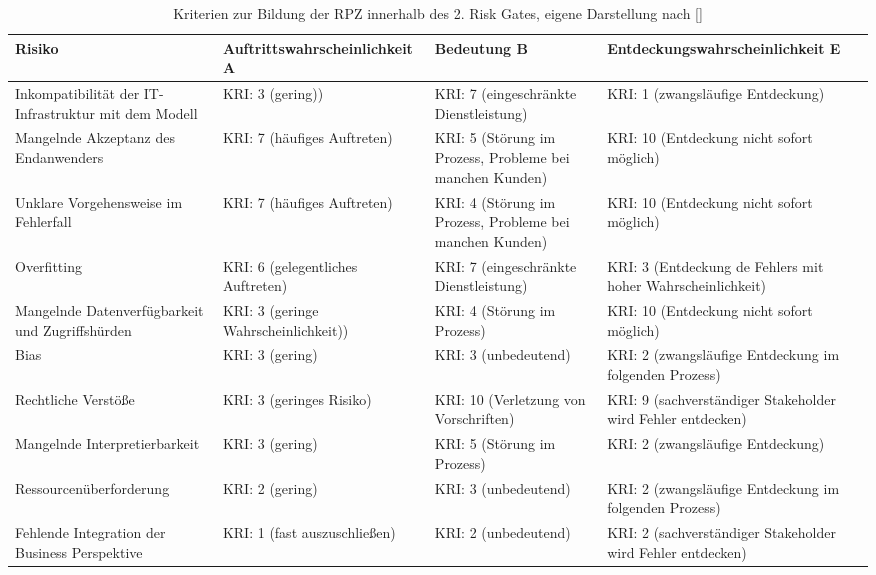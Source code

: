 \begin{table}[H]
\centering
\renewcommand{\arraystretch}{1.3}
\begin{tabular}{|p{3cm}|p{4.9cm}|p{3cm}|p{4.9cm}|}
\hline
\textbf{Risiko} & \textbf{Auftritts\-wahrscheinlichkeit A} & \textbf{Bedeutung B} & \textbf{Entdeckungs\-wahrscheinlichkeit E} \\
\hline

Inkompatibilität der IT-Infrastruktur mit dem Modell
& KRI: 3 (gering))
& KRI: 7 (eingeschränkte Dienstleistung)
& KRI: 1 (zwangsläufige Entdeckung) \\
\hline

Mangelnde Akzeptanz des Endanwenders
& KRI: 7 (häufiges Auftreten)
& KRI: 5 (Störung im Prozess, Probleme bei manchen Kunden)
& KRI: 10 (Entdeckung nicht sofort möglich) \\
\hline

Unklare Vorgehensweise im Fehlerfall
& KRI: 7 (häufiges Auftreten)
& KRI: 4 (Störung im Prozess, Probleme bei manchen Kunden)
& KRI: 10 (Entdeckung nicht sofort möglich) \\
\hline

Overfitting 
& KRI: 6 (gelegentliches Auftreten)
& KRI: 7 (eingeschränkte Dienstleistung)
& KRI: 3 (Entdeckung de Fehlers mit hoher Wahrscheinlichkeit) \\
\hline

Mangelnde Datenverfügbarkeit und Zugriffshürden 
& KRI: 3 (geringe Wahrscheinlichkeit))
& KRI: 4 (Störung im Prozess)
& KRI: 10 (Entdeckung nicht sofort möglich) \\
\hline

Bias 
& KRI: 3 (gering)
& KRI: 3 (unbedeutend)
& KRI: 2 (zwangsläufige Entdeckung im folgenden Prozess) \\
\hline

Rechtliche Verstöße
& KRI: 3 (geringes Risiko)
& KRI: 10 (Verletzung von Vorschriften)
& KRI: 9 (sachverständiger Stakeholder wird Fehler entdecken) \\
\hline

Mangelnde Interpretierbarkeit
& KRI: 3 (gering)
& KRI: 5 (Störung im Prozess)
& KRI: 2 (zwangsläufige Entdeckung) \\
\hline

Ressourcenüberforderung
& KRI: 2 (gering)
& KRI: 3 (unbedeutend)
& KRI: 2 (zwangsläufige Entdeckung im folgenden Prozess) \\
\hline

Fehlende Integration der Business Perspektive
& KRI: 1 (fast auszuschließen)
& KRI: 2 (unbedeutend)
& KRI: 2 (sachverständiger Stakeholder wird Fehler entdecken) \\
\hline

\end{tabular}
\caption{Kriterien zur Bildung der RPZ innerhalb des 2. Risk Gates, eigene Darstellung nach []}
\label{tab:kriterien_rpz}
\end{table}

